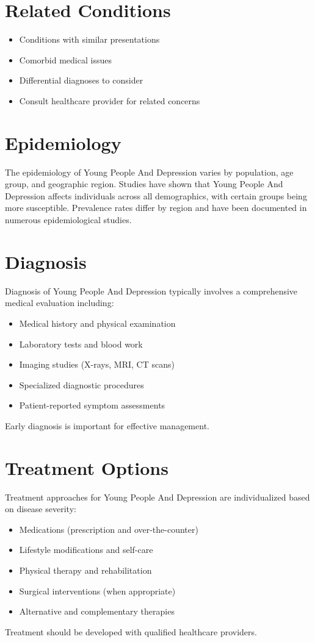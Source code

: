 \section*{Related Conditions}
\begin{itemize}
  \item Conditions with similar presentations
  \item Comorbid medical issues
  \item Differential diagnoses to consider
  \item Consult healthcare provider for related concerns
\end{itemize}

\section*{Epidemiology}
The epidemiology of Young People And Depression varies by population, age group, and geographic region. Studies have shown that Young People And Depression affects individuals across all demographics, with certain groups being more susceptible. Prevalence rates differ by region and have been documented in numerous epidemiological studies.

\section*{Diagnosis}
Diagnosis of Young People And Depression typically involves a comprehensive medical evaluation including:
\begin{itemize}
  \item Medical history and physical examination
  \item Laboratory tests and blood work
  \item Imaging studies (X-rays, MRI, CT scans)
  \item Specialized diagnostic procedures
  \item Patient-reported symptom assessments
\end{itemize}
Early diagnosis is important for effective management.

\section*{Treatment Options}
Treatment approaches for Young People And Depression are individualized based on disease severity:
\begin{itemize}
  \item Medications (prescription and over-the-counter)
  \item Lifestyle modifications and self-care
  \item Physical therapy and rehabilitation
  \item Surgical interventions (when appropriate)
  \item Alternative and complementary therapies
\end{itemize}
Treatment should be developed with qualified healthcare providers.

